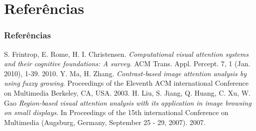 \documentclass{beamer}
\begin{document}
\section{Referências}
\begin{frame}
    \frametitle{Referências}
    \begin{thebibliography}{9}
            S. Frintrop, E. Rome, H. I. Christensen. 
            \emph{Computational visual attention systems and their cognitive foundations: A survey}. 
            ACM Trans. Appl. Percept. 7, 1 (Jan. 2010), 1-39.
            2010.
            Y. Ma, H. Zhang.
            \emph{Contrast-based image attention analysis by using fuzzy growing}.
            Proceedings of the Eleventh ACM international Conference on Multimedia
            Berkeley, CA, USA.
            2003.
            H. Liu, S. Jiang, Q. Huang, C. Xu, W. Gao
            \emph{Region-based visual attention analysis with its application in image browsing on small displays}. 
            In Proceedings of the 15th international Conference on Multimedia  (Augsburg, Germany, September 25 - 29, 2007).
            2007.
            
    \end{thebibliography}
\end{frame}
\end{document}
